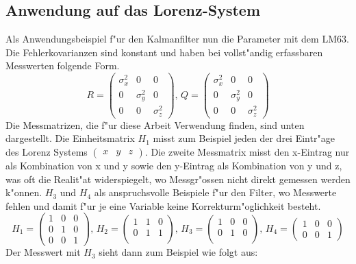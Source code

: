 \begin{refsection}
\subsection{Anwendung auf das Lorenz-System}
Als Anwendungsbeispiel f"ur den Kalmanfilter nun die Parameter mit dem LM63. Die Fehlerkovarianzen sind konstant und haben bei vollst"andig erfassbaren Messwerten folgende Form.
\[R=\begin{pmatrix}
\sigma^{2}_{x} & 0 & 0 \\ 
0 & \sigma^{2}_{y} & 0 \\ 
0 & 0 & \sigma^{2}_{z}
\end{pmatrix}  \text{, }
Q=\begin{pmatrix}
\sigma^{2}_{x} & 0 & 0 \\ 
0 & \sigma^{2}_{y} & 0 \\ 
0 & 0 & \sigma^{2}_{z}
\end{pmatrix} 
\]
Die Messmatrizen, die f"ur diese Arbeit Verwendung finden, sind unten dargestellt. Die Einheitsmatrix $H_{1}$ misst zum Beispiel jeden der drei Eintr"age des Lorenz Systems $\begin{pmatrix}x & y & z
\end{pmatrix}$. Die zweite Messmatrix misst den x-Eintrag nur als Kombination von x und y sowie den y-Eintrag als Kombination von y und z, was oft die Realit"at widerspiegelt, wo Messgr"ossen nicht direkt gemessen werden k"onnen. $H_{3}$ und $H_{4}$ als anspruchsvolle Beispiele f"ur den Filter, wo Messwerte fehlen und damit f"ur je eine Variable keine Korrekturm"oglichkeit besteht.
\[H_{1}=\begin{pmatrix}
1 & 0 & 0 \\ 
0 & 1 & 0 \\ 
0 & 0 & 1
\end{pmatrix} 
\text{, }
H_{2}=\begin{pmatrix}
1 & 1 & 0 \\ 
0 & 1 & 1 \\ 
\end{pmatrix}
\text{, }
H_{3}=\begin{pmatrix}
1 & 0 & 0 \\ 
0 & 1 & 0 \\ 
\end{pmatrix}
\text{, }
H_{4}=\begin{pmatrix}
1 & 0 & 0 \\  
0 & 0 & 1
\end{pmatrix}
\]
Der Messwert mit $H_{3}$ sieht dann zum Beispiel wie folgt aus:

\end{refsection}
